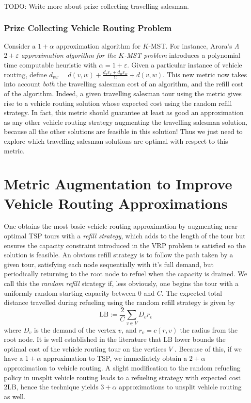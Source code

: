 \documentclass{article}
\theoremstyle{plain}
\theoremstyle{plain}
\begin{document}
TODO: Write more about prize collecting travelling salesman.

\section{Prize Collecting Vehicle Routing Problem}

Consider a $1 + \alpha$ approximation algorithm for $K$-MST. For instance, Arora's {\it A $2 + \varepsilon$ approximation algorithm for the $K$-MST problem} introduces a polynomial time computable heuristic with $\alpha = 1 + \varepsilon$. Given a particular instance of vehicle routing, define $d_{vw} = d(v,w) + \frac{d_vr_v + d_wr_w}{C} + d(v,w)$. This new metric now takes into account {\it both} the travelling salesman cost of an algorithm, and the refill cost of the algorithm. Indeed, a given travelling salesman tour using the metric gives rise to a vehicle routing solution whose expected cost using the random refill strategy. In fact, this metric should guarantee at least as good an approximation as any other vehicle routing strategy augmenting the travelling salesman solution, because all the other solutions are feasible in this solution! Thus we just need to explore which travelling salesman solutions are optimal with respect to this metric.

\part{Metric Augmentation to Improve Vehicle Routing Approximations}


One obtains the most basic vehicle routing approximation by augmenting near-optimal TSP tours with a {\it refill strategy}, which adds to the length of the tour but ensures the capacity constraint introduced in the VRP problem is satisfied so the solution is feasible. An obvious refill strategy is to follow the path taken by a given tour, satisfying each node sequentially with it's full demand, but periodically returning to the root node to refuel when the capacity is drained. We call this the {\it random refill} strategy if, less obviously, one begins the tour with a uniformly random starting capacity between $0$ and $C$. The expected total distance travelled during refueling using the random refill strategy is given by
%
\[ \text{LB} := \frac{2}{C} \sum_{v \in V} D_v r_v \]
%
where $D_v$ is the demand of the vertex $v$, and $r_v = c(r,v)$ the radius from the root node. It is well established in the literature that $\text{LB}$ lower bounds the optimal cost of the vehicle routing tour on the vertices $V$ \cite{RandomRefillPaper}. Because of this, if we have a $1 + \alpha$ approximation to TSP, we immediately obtain a $2 + \alpha$ approximation to vehicle routing. A slight modification to the random refueling policy in unsplit vehicle routing leads to a refueling strategy with expected cost $2 \text{LB}$, hence the technique yields $3 + \alpha$ approximations to unsplit vehicle routing as well.
\end{document}
